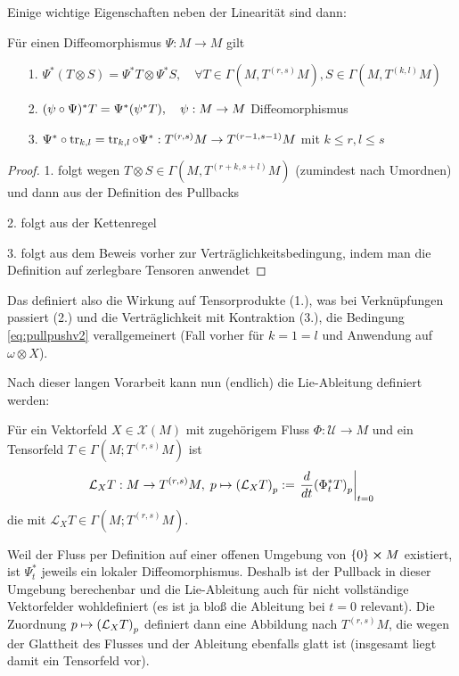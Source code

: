 \documentclass[../H_Analysis_main.tex]{subfiles}
\begin{document}
Einige wichtige Eigenschaften neben der Linearität sind dann:
\begin{satz}
Für einen Diffeomorphismus $\Psi: M \rightarrow M$ gilt%

\begin{itemize}
\item[1.] $\Psi^*(T \otimes S) = \Psi^*T \otimes \Psi^*S, \quad \forall T \in \Gamma(M, T^{(r, s)}M), S \in \Gamma(M, T^{(k, l)}M)$

\item[2.] $(\psi \circ \Psi)^* T = \Psi^*\qty(\psi^*T), \quad \psi: M \rightarrow M$ Diffeomorphismus

\item[3.] $\Psi^* \circ \tr_{k, l} = \tr_{k, l} \circ \Psi^*: T^{(r, s)}M \rightarrow T^{(r - 1, s - 1)}M$ mit $k \leq r, l \leq s$
\end{itemize}
\end{satz}

\begin{proof}
1. folgt wegen $T \otimes S \in \Gamma(M, T^{(r + k, s + l)}M)$ (zumindest nach Umordnen) und dann aus der Definition des Pullbacks

2. folgt aus der Kettenregel

3. folgt aus dem Beweis vorher zur Verträglichkeitsbedingung, indem man die Definition auf zerlegbare Tensoren anwendet
\end{proof}

Das definiert also die Wirkung auf Tensorprodukte (1.), was bei Verknüpfungen passiert (2.) und die Verträglichkeit mit Kontraktion (3.), die Bedingung \eqref{eq:pullpushv2} verallgemeinert (Fall vorher für $k = 1 = l$ und Anwendung auf $\omega \otimes X$).


Nach dieser langen Vorarbeit kann nun (endlich) die Lie-Ableitung definiert werden:
\begin{defi}
Für ein Vektorfeld $X \in \mathcal{X}(M)$ mit zugehörigem Fluss $\Phi: \mathcal{U} \rightarrow M$ und ein Tensorfeld $T \in \Gamma(M; T^{(r, s)}M)$ ist
\begin{equation}
\mathcal{L}_X T: M \rightarrow T^{(r, s)}M, \; p \mapsto \qty(\mathcal{L}_X T)_p := \eval{\dv{t} \qty(\Phi_t^* T)_p}_{t = 0}
\end{equation}
die  mit $\mathcal{L}_X T \in \Gamma(M; T^{(r, s)}M)$.
\end{defi}
Weil der Fluss per Definition auf einer offenen Umgebung von $\qty{0} \cross M$ existiert, ist $\Psi_t^*$ jeweils ein lokaler Diffeomorphismus. Deshalb ist der Pullback in dieser Umgebung berechenbar und die Lie-Ableitung auch für nicht vollständige Vektorfelder wohldefiniert (es ist ja bloß die Ableitung bei $t = 0$ relevant). Die Zuordnung $p \mapsto \qty(\mathcal{L}_X T)_p$ definiert dann eine Abbildung nach $T^{(r, s)}M$, die wegen der Glattheit des Flusses und der Ableitung ebenfalls glatt ist (insgesamt liegt damit ein Tensorfeld vor).
\end{document}
